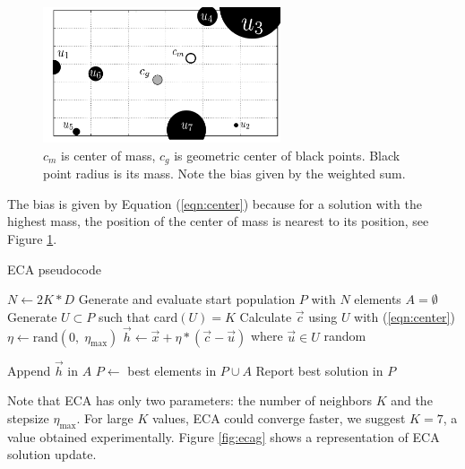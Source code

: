 \documentclass{svproc}
\begin{document}
\begin{figure}[!ht]
	\centering
	\includegraphics[width=7cm]{img/masses.pdf}
	\caption{$c_m$ is center of mass, $c_g$ is geometric center of black points. %
	Black point radius is its mass. Note the bias given by the weighted sum.}
	\label{fig:masses}       %
\end{figure}
%
%
\begin{note}
The bias is given by Equation (\ref{eqn:center}) because for a solution 
with the highest mass, the position of the center of mass is nearest to 
its position, see Figure \ref{fig:masses}.
\end{note}
%
\begin{algorithm}[!ht]
	\caption{ECA pseudocode}
	\label{algoritmoEca}
	\begin{algorithmic}[1]
		\State $N \gets 2K * D$
		\State Generate and evaluate start population $P$ with $N$ elements
			\State $A = \emptyset$
				\State Generate $U \subset P$ such that  card$(U) = K$
				\State Calculate $\vec{c}$ using $U$ with (\ref{eqn:center})
				\State $\eta \gets \text{rand}(0,\; \eta_{\max}) $ 
				\State $\vec{h} \gets \vec{x} + \eta  * (\vec{c} - \vec{u}) $ where $ \vec{u} \in U $ random
				
					\State Append $\vec{h} $ in $A$
				\EndIf
			\EndFor
			\State $P \gets $ best elements in $P \cup A$
		\EndWhile
		\State Report best solution in $P$
		\EndProcedure
	\end{algorithmic}
\end{algorithm}
%

Note that ECA  has only two parameters: the number of neighbors $K$ and 
the stepsize $\eta_{\max}$.  For large $K$ values, ECA could converge 
faster, we suggest $K = 7$, a value obtained experimentally. Figure \ref{fig:ecag} 
shows a representation of ECA solution update. 
\end{document}
